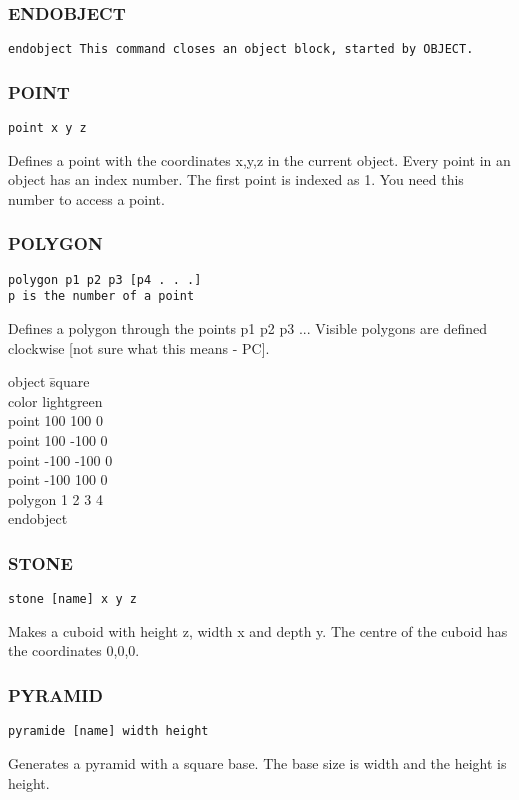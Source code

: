 \subsubsection{ENDOBJECT}
\tt{endobject}
This command closes an object block, started by OBJECT.

\subsubsection{POINT}
\tt{point x y z}

Defines a point with the coordinates x,y,z in the current object. Every 
point in an object has an index number. The first point is indexed as 1. You
need this number to access a point.

\subsubsection{POLYGON}
\tt{polygon p1 p2 p3 [p4 . . .]}\\
p is the number of a point

Defines a polygon through the points p1 p2 p3 ... Visible polygons are
defined clockwise [not sure what this means - PC].
\tt{
\begin{tabbing}
object \=square\\
\>color lightgreen\\
\>point 100 100 0\\
\>point 100 -100 0\\
\>point -100 -100 0\\
\>point -100 100 0\\
\>polygon 1 2 3 4\\
endobject\\
\end{tabbing}
}

\subsubsection{STONE}
\tt{stone [name] x y z}

Makes a cuboid with height z, width x and depth y. The centre of the
cuboid has the coordinates 0,0,0.

\subsubsection{PYRAMID}
\tt{pyramide [name] width height}

Generates a pyramid with a square base. The base size is width and the
height is height.

